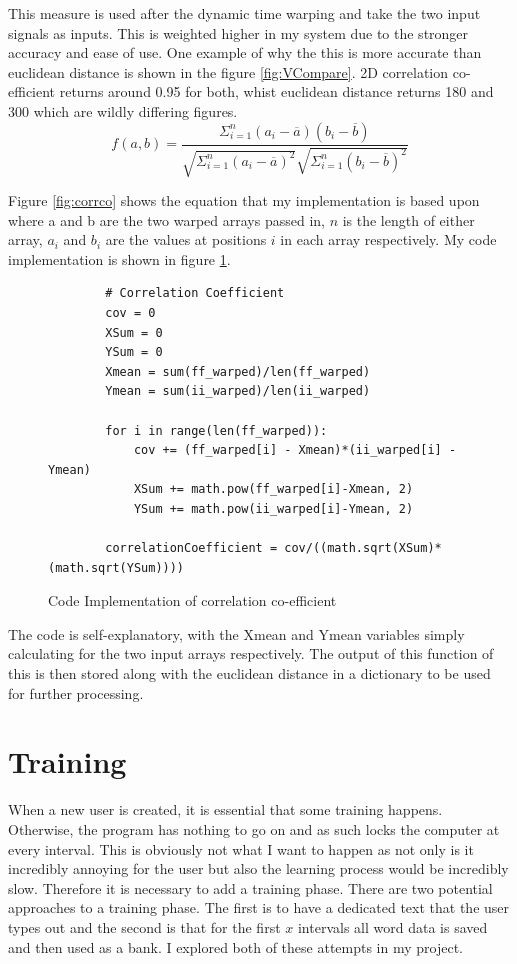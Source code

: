 \documentclass[10pt,a4paper]{report}
\begin{document}
This measure is used after the dynamic time warping and take the two input signals as inputs. This is weighted higher in my system due to the stronger accuracy and ease of use. One example of why the this is more accurate than euclidean distance is shown in the figure \ref{fig:VCompare}. 2D correlation co-efficient returns around 0.95 for both, whist euclidean distance returns 180 and 300 which are wildly differing figures.
\begin{equation}
	f(a,b) = \frac{\Sigma^n_{i=1}(a_i-\overline{a})(b_i - \overline{b})}{\sqrt{\Sigma^n_{i=1} (a_i-\overline{a})^2}\sqrt{\Sigma^n_{i=1}(b_i-\overline{b})^2}}
	\label{fig:corrco}
\end{equation}

Figure \ref{fig:corrco} shows the equation that my implementation is based upon where a and b are the two warped arrays passed in, \(n\) is the length of either array, \(a_i\) and \(b_i\) are the values at positions \(i\) in each array respectively. My code implementation is shown in figure \ref{fig:CodeCorr}.

\begin{figure}[h!]
	\begin{lstlisting}
		# Correlation Coefficient
        cov = 0
        XSum = 0
        YSum = 0
        Xmean = sum(ff_warped)/len(ff_warped)
        Ymean = sum(ii_warped)/len(ii_warped)
                    
       	for i in range(len(ff_warped)):
        	cov += (ff_warped[i] - Xmean)*(ii_warped[i] - Ymean)
            XSum += math.pow(ff_warped[i]-Xmean, 2)
            YSum += math.pow(ii_warped[i]-Ymean, 2)
                            
        correlationCoefficient = cov/((math.sqrt(XSum)*(math.sqrt(YSum))))
       \end{lstlisting}
       \caption{Code Implementation of correlation co-efficient}
       \label{fig:CodeCorr}
\end{figure}

The code is self-explanatory, with the Xmean and Ymean variables simply calculating for the two input arrays respectively. The output of this function of this is then stored along with the euclidean distance in a dictionary to be used for further processing.

\section{Training}
When a new user is created, it is essential that some training happens. Otherwise, the program has nothing to go on and as such locks the computer at every interval. This is obviously not what I want to happen as not only is it incredibly annoying for the user but also the learning process would be incredibly slow. Therefore it is necessary to add a training phase. There are two potential approaches to a training phase. The first is to have a dedicated text that the user types out and the second is that for the first \(x\) intervals all word data is saved and then used as a bank. I explored both of these attempts in my project.
\end{document}
